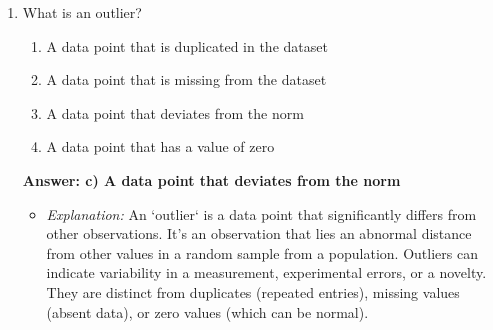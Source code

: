 \documentclass{article}
\begin{document}
\begin{enumerate}[label=\textbf{Question \arabic*.}]
\item What is an outlier?
    \begin{enumerate}[label=\alph*)]
        \item A data point that is duplicated in the dataset
        \item A data point that is missing from the dataset
        \item A data point that deviates from the norm
        \item A data point that has a value of zero
    \end{enumerate}
    \textbf{Answer: c) A data point that deviates from the norm}
    \begin{itemize}
        \item \textit{Explanation:} An `outlier` is a data point that significantly differs from other observations. It's an observation that lies an abnormal distance from other values in a random sample from a population. Outliers can indicate variability in a measurement, experimental errors, or a novelty. They are distinct from duplicates (repeated entries), missing values (absent data), or zero values (which can be normal).
    \end{itemize}

\end{enumerate}
\end{document}
